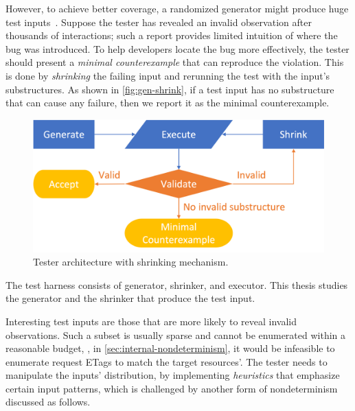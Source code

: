 However, to achieve better coverage, a randomized generator might produce huge
test inputs~\cite{Hughes2016}.  Suppose the tester has revealed an invalid
observation after thousands of interactions; such a report provides limited
intuition of where the bug was introduced.  To help developers locate the bug
more effectively, the tester should present a {\em minimal counterexample} that
can reproduce the violation.  This is done by {\em shrinking} the failing input
and rerunning the test with the input's substructures.  As shown
in \autoref{fig:gen-shrink}, if a test input has no substructure that can cause
any failure, then we report it as the minimal counterexample.
\begin{figure}
\vspace*{2em}
  \includegraphics[width=.8\linewidth]{figures/gen-shrink}
  \caption{Tester architecture with shrinking mechanism.}
  \label{fig:gen-shrink}
\end{figure}

The test harness consists of generator, shrinker, and executor.  This thesis
studies the generator and the shrinker that produce the test input.

Interesting test inputs are those that are more likely to reveal invalid
observations.  Such a subset is usually sparse and cannot be enumerated within a
reasonable budget, \eg, in \autoref{sec:internal-nondeterminism}, it would be
infeasible to enumerate request ETags to match the target resources'.  The
tester needs to manipulate the inputs' distribution, by implementing {\em
heuristics} that emphasize certain input patterns, which is challenged by
another form of nondeterminism discussed as follows.

